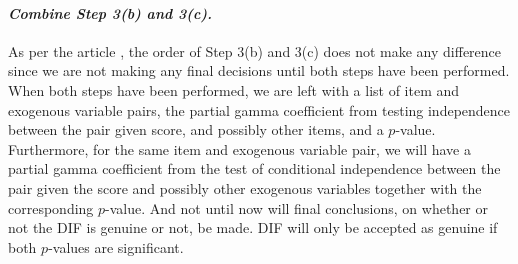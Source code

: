 \documentclass[a4project,12pt]{article}
\theoremstyle{examplestyle}
\theoremstyle{defstyle}
\theoremstyle{thmstyle}
\begin{document}
\paragraph{\textit{Combine Step 3(b) and 3(c).}} As per the article \cite{Kreiner_Christensen_2011}, the order of Step 3(b) and 3(c) does not make any difference since we are not making any final decisions until both steps have been performed. When both steps have been performed, we are left with a list of item and exogenous variable pairs, the partial gamma coefficient from testing independence between the pair given score, and possibly other items, and a $p$-value. Furthermore, for the same item and exogenous variable pair, we will have a partial gamma coefficient from the test of conditional independence between the pair given the score and possibly other exogenous variables together with the corresponding $p$-value. And not until now will final conclusions, on whether or not the DIF is genuine or not, be made. DIF will only be accepted as genuine if both $p$-values are significant.
\end{document}
